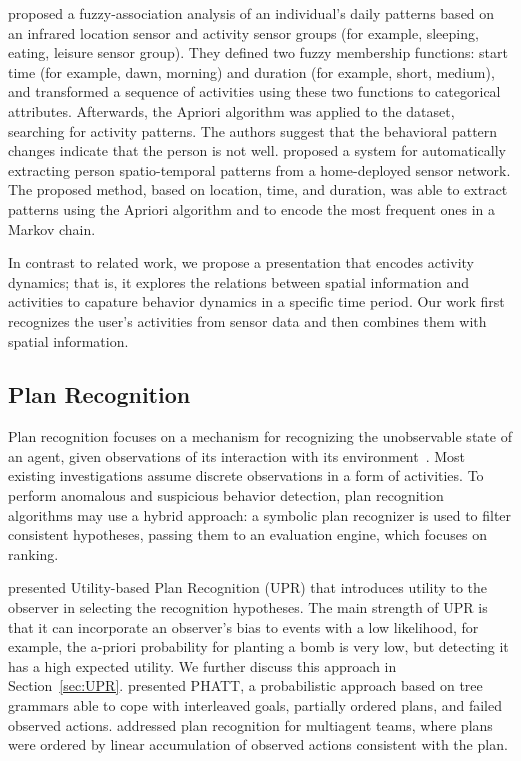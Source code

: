 \cite{Lee04daily} proposed a fuzzy-association analysis of an individual's daily patterns based on an infrared location sensor and activity sensor groups (for example, sleeping, eating, leisure sensor group). They defined two fuzzy membership functions: start time (for example, dawn, morning) and duration (for example, short, medium), and transformed a sequence of activities using these two functions to categorical attributes. Afterwards, the Apriori algorithm was applied to the dataset, searching for activity patterns. The authors suggest that the behavioral pattern changes indicate that the person is not well. 
%
\cite{Lymberopoulos} proposed a system for automatically extracting person spatio-temporal patterns from a home-deployed sensor network. The proposed method, based on location, time, and duration, was able to extract patterns using the Apriori algorithm and to encode the most frequent ones in a Markov chain. 

In contrast to related work, we propose a presentation that encodes activity dynamics; that is, it explores the relations between spatial information and activities to capature behavior dynamics in a specific time period. Our work first recognizes the user's activities from sensor data and then combines them with spatial information. %


\subsection{Plan Recognition}

Plan recognition focuses on a mechanism for recognizing the unobservable state of an agent, given observations of its interaction with its environment~\citep{Avrahami-Zilberbrand2009}. Most existing investigations assume discrete observations in a form of activities. To perform anomalous and suspicious behavior detection, plan recognition algorithms may use a hybrid approach: a symbolic plan recognizer is used to filter consistent hypotheses, passing them to an evaluation engine, which focuses on ranking. 

\cite{Avrahami-Zilberbrand2007} presented Utility-based Plan Recognition (UPR) that introduces utility to the observer in selecting the recognition hypotheses. The main strength of UPR is that it can incorporate an observer's bias to events with a low likelihood, for example, the a-priori probability for planting a bomb is very low, but detecting it has a high expected utility. We further discuss this approach in Section~\ref{sec:UPR}.  \cite{Geib2009} presented PHATT, a probabilistic approach based on tree grammars able to cope with interleaved goals, partially ordered plans, and failed observed actions. \cite{Sukthankar-AAAI2008} addressed plan recognition for multiagent teams, where plans were ordered by linear accumulation of observed actions consistent with the plan.


